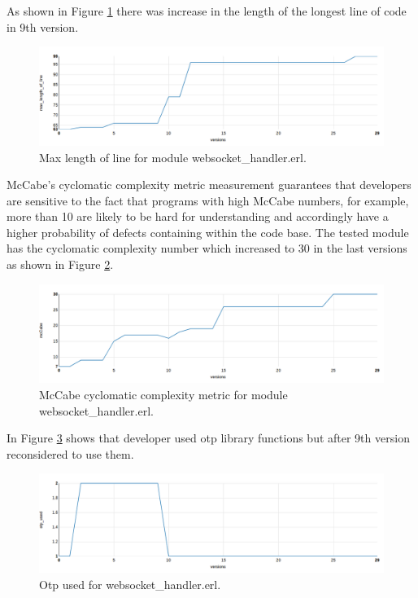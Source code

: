 As shown in Figure \ref{fig:chat5} there was increase in the length of the longest line of code in 9th version. 
\begin{figure}[ht]
	\centering
	\includegraphics[width=\textwidth]{figures/chat5.png}
	\caption{Max length of line for module websocket\_handler.erl.}
	\label{fig:chat5}
\end{figure}

McCabe’s cyclomatic complexity metric measurement guarantees that developers are sensitive to the fact that programs with high McCabe numbers, for example, more than 10 are likely to be hard for understanding and accordingly have a higher probability of defects containing within the code base. The tested module has the cyclomatic complexity number which increased to 30 in the last versions as shown in Figure \ref{fig:mcCabe}.

\begin{figure}[ht]
	\centering
	\includegraphics[width=\textwidth]{figures/mcCabe.png}
	\caption{
	McCabe cyclomatic complexity metric for module websocket\_handler.erl.}
	\label{fig:mcCabe}
\end{figure}

In Figure \ref{fig:chat2} shows that developer used otp library functions but after 9th version reconsidered to use them.

\begin{figure}[ht]
	\centering
	\includegraphics[width=\textwidth]{figures/chat2.png}
	\caption{Otp used for websocket\_handler.erl.}
	\label{fig:chat2}
\end{figure}

